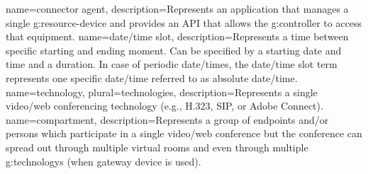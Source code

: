 {
  name=connector agent,
  description={Represents an application that manages a single \gls{g:resource-device} 
    and provides an API that allows the \gls{g:controller} to access that equipment.}
}
{
  name=date/time slot,
  description={Represents a time between specific starting and ending moment. 
    Can be specified by a starting date and time and a duration. In case of
    periodic date/times, the date/time slot term represents one specific 
    date/time referred to as absolute date/time.}
}
{
  name=technology,
  plural=technologies,
  description={Represents a single video/web conferencing technology (e.g., 
    H.323, SIP, or Adobe Connect).}
}
{
  name=compartment,
  description={Represents a group of endpoints and/or persons which participate 
    in a single video/web conference but the conference can spread out through multiple 
    virtual rooms and even through multiple \glspl{g:technology} (when gateway device is used).}
}


\renewcommand*{\glossaryname}{List of Terms}  %
\renewcommand*{\glspostdescription}{}         %
\renewcommand*{\glsnamefont}[1]{\textbf{#1}}  %
\renewcommand*{\arraystretch}{1.4}            %
\renewcommand*\glossarypreamble{\addcontentsline{toc}{chapter}{\glossaryname}}
\setlength{\glspagelistwidth}{0.1\linewidth}
\setlength{}        %
\glsaddall                                    %
\renewcommand*{\glsgroupskip}{}               %
\printglossary[type=main]                     %

